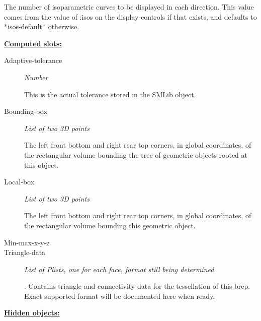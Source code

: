 \documentclass [11pt]{book}
\begin{document}
\begin{itemize}
\begin{description}
 The number of isoparametric curves to be displayed in each direction.
This value comes from the value of :isos on the display-controls if that exists, and defaults
to *isos-default* otherwise.




\end{description}






\textbf{
\underline{Computed slots:}}

\begin{description}

\item [Adaptive-tolerance]
\emph{Number}

 This is the actual tolerance stored in the SMLib object.




\item [Bounding-box]
\emph{List of two 3D points}

 The left front bottom and right rear top corners, in global coordinates,
of the rectangular volume bounding the tree of geometric objects rooted at this object.




\item [Local-box]
\emph{List of two 3D points}

 The left front bottom and right rear top corners, in global coordinates,
of the rectangular volume bounding this geometric object.




\item [Min-max-x-y-z]





\item [Triangle-data]
\emph{List of Plists, one for each face, format still being determined}

.
Contains triangle and connectivity data for the tessellation
of this brep. Exact supported format will be documented here when ready.




\end{description}






\textbf{
\underline{Hidden objects:}}


\end{itemize}
\end{document}
